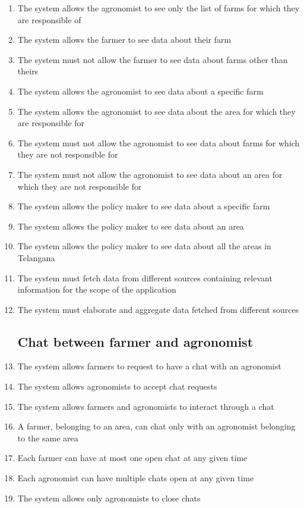 \documentclass[10pt]{report}
\begin{document}
\begin{enumerate} [label=(R\arabic*), font=\itshape]
        \subsection*{Show data}
        \item The system allows the agronomist to see only the list of farms for which they are responsible of
        \item The system allows the farmer to see data about their farm
        \item The system must not allow the farmer to see data about farms other than theirs
        \item The system allows the agronomist to see data about a specific farm
        \item The system allows the agronomist to see data about the area for which they are responsible for
        \item The system must not allow the agronomist to see data about farms for which they are not responsible for 
        \item The system must not allow the agronomist to see data about an area for which they are not responsible for
        \item The system allows the policy maker to see data about a specific farm
        \item The system allows the policy maker to see data about an area
        \item The system allows the policy maker to see data about all the areas in Telangana
        \item The system must fetch data from different sources containing relevant information for the scope of the application
        \item The system must elaborate and aggregate data fetched from different sources
        \subsection*{Chat between farmer and agronomist}
        \item The system allows farmers to request to have a chat with an agronomist
        \item The system allows agronomists to accept chat requests
        \item The system allows farmers and agronomists to interact through a chat
        \item A farmer, belonging to an area, can chat only with an agronomist belonging to the same area
        \item Each farmer can have at most one open chat at any given time
        \item Each agronomist can have multiple chats open at any given time
        \item The system allows only agronomists to close chats

\end{enumerate}
\end{document}
